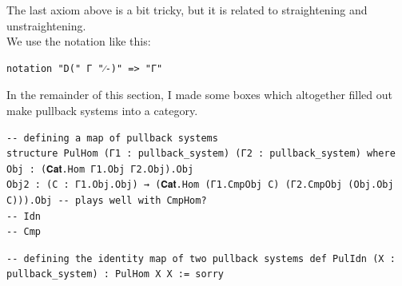 \documentclass{book}
\theoremstyle{definition}
\newcounter{lcounter}
\begin{document}
The last axiom above is a bit tricky, but it is related to straightening and unstraightening.\\ We use the notation like this:

 \begin{center} \begin{tcolorbox}[width=5in,colback={white},title={\begin{center}\texttt{Lean \thelcounter} \addtocounter{lcounter}{1} \end{center}},colbacktitle=Blue,coltitle=black] \begin{verbatim}
notation "D(" Γ "⁄-)" => "Γ"
\end{verbatim} \end{tcolorbox} \end{center}
In the remainder of this section, I made some boxes which altogether filled out make pullback systems into a category.\\
\begin{center} \begin{tcolorbox}[width=5in,colback={white},title={\begin{center}\texttt{Lean \thelcounter} \addtocounter{lcounter}{1} \end{center}},colbacktitle=Blue,coltitle=black] \begin{verbatim}
-- defining a map of pullback systems
structure PulHom (Γ1 : pullback_system) (Γ2 : pullback_system) where
Obj : (𝐂𝐚𝐭.Hom Γ1.Obj Γ2.Obj).Obj
Obj2 : (C : Γ1.Obj.Obj) → (𝐂𝐚𝐭.Hom (Γ1.CmpObj C) (Γ2.CmpObj (Obj.Obj C))).Obj -- plays well with CmpHom?
-- Idn
-- Cmp
\end{verbatim} \end{tcolorbox} \end{center}
\begin{center} \begin{tcolorbox}[width=5in,colback={white},title={\begin{center}\texttt{Lean \thelcounter} \addtocounter{lcounter}{1} \end{center}},colbacktitle=Blue,coltitle=black] \begin{verbatim}
-- defining the identity map of two pullback systems def PulIdn (X : pullback_system) : PulHom X X := sorry
\end{verbatim} \end{tcolorbox}

 \end{center}
\end{document}
